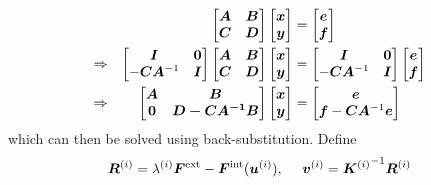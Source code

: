 \begin{equation}
\begin{aligned}
    && \begin{bmatrix}
        \bm{A} & \bm{B} \\ \bm{C} & \bm{D}
    \end{bmatrix} 
    \begin{bmatrix}
        \bm{x} \\ \bm{y}
    \end{bmatrix} &= \begin{bmatrix}
        \bm{e} \\ \bm{f}
    \end{bmatrix} \\ \Rightarrow && 
    \begin{bmatrix}
        \bm{I} & \bm{0} \\ -\bm{C}\bm{A}^{-1} & \bm{I}
    \end{bmatrix} 
    \begin{bmatrix}
        \bm{A} & \bm{B} \\ \bm{C} & \bm{D}
    \end{bmatrix} 
    \begin{bmatrix}
        \bm{x} \\ \bm{y}
    \end{bmatrix} &= 
    \begin{bmatrix}
        \bm{I} & \bm{0} \\ -\bm{C}\bm{A}^{-1} & \bm{I}
    \end{bmatrix} 
    \begin{bmatrix}
        \bm{e} \\ \bm{f}
    \end{bmatrix} \\ \Rightarrow && 
    \begin{bmatrix}
        \bm{A} & \bm{B} \\ \bm{0} & \bm{D - \bm{C}\bm{A}^{-1}\bm{B}}
    \end{bmatrix} 
    \begin{bmatrix}
        \bm{x} \\ \bm{y}
    \end{bmatrix} &= 
    \begin{bmatrix}
        \bm{e} \\ \bm{f} - \bm{C}\bm{A}^{-1}\bm{e}
    \end{bmatrix}
\end{aligned}
\end{equation}
which can then be solved using back-substitution. 
Define 
\begin{equation}
    \bm{R}^{(i)} = \lambda^{(i)} \bm{F}^{\textrm{ext}} - \bm{F}^{\textrm{int}}(\bm{u}^{(i)}), ~~~~ \bm{v}^{(i)} = {\bm{K}^{(i)}}^{-1} \bm{R}^{(i)}
\end{equation}

